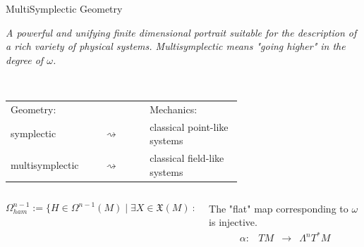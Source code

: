 \documentclass[final,a0paper,20pt,
						pdftex,
            pdfauthor={Antonio Michele Miti},
            pdftitle={Homotopy title},
            pdfsubject={Poster for the conference Super19 in Luxembourg},
            pdfkeywords={Some Keywords},
            pdfproducer={Latex with hyperref, or other system},
            pdfcreator={pdflatex, or other tool}
            ]{beamer}
\newcommand{\pinned}[1]{
    \faThumbTack 
    \hfill
    #1
    \hfill \faThumbTack
    \\
    }
\begin{document}
\begin{frame}[t]
\begin{columns}[t]
\begin{column}{\onecolwid}
	\begin{block}{\pinned{MultiSymplectic Geometry}}			
		\vspace{-.5em}
		\centering
		\parbox{0.98\linewidth}{%
		\emph{
			A powerful and unifying finite dimensional portrait suitable for the description of a rich variety of physical systems.
		Multisymplectic means \emph{"going higher"} in the degree of $\omega$.
		}
		}
		\\
		\begin{center}\begin{tabular}{p{0.2\linewidth} p{0.15\linewidth} p{0.3\linewidth}}
		Geometry: & & Mechanics: \\
		symplectic &\centering $\rightsquigarrow$ & classical point-like systems \\
		multisymplectic &\centering $\rightsquigarrow$ & classical field-like systems
		\end{tabular}\end{center}
		\vspace{.5em}
		\begin{columns}[T]
			\begin{column}{.63\linewidth}
				\begin{defblock}
						
				\end{defblock}
				\begin{defblock}
					\begin{displaymath}
						\Omega^{n-1}_{ham} 	:=
						\biggr\{ H \in  \Omega^{n-1}(M) \; \biggr\vert \; 
							\exists X \in \mathfrak{X}(M) ~:~ d H = -\iota_X \omega \biggr\} 
					\end{displaymath}
				\end{defblock}				
			\end{column}
			\begin{column}{.35\linewidth}
				\begin{defblock}
					The "flat" map corresponding  to $\omega$ is injective.
					\begin{alignat*}{2}
						\alpha \colon &  T M &\longrightarrow& \Lambda^n T^\ast M \\

\end{alignat*}
\end{defblock}
\end{column}
\end{columns}
\end{block}
\end{column}
\end{columns}
\end{frame}
\end{document}
